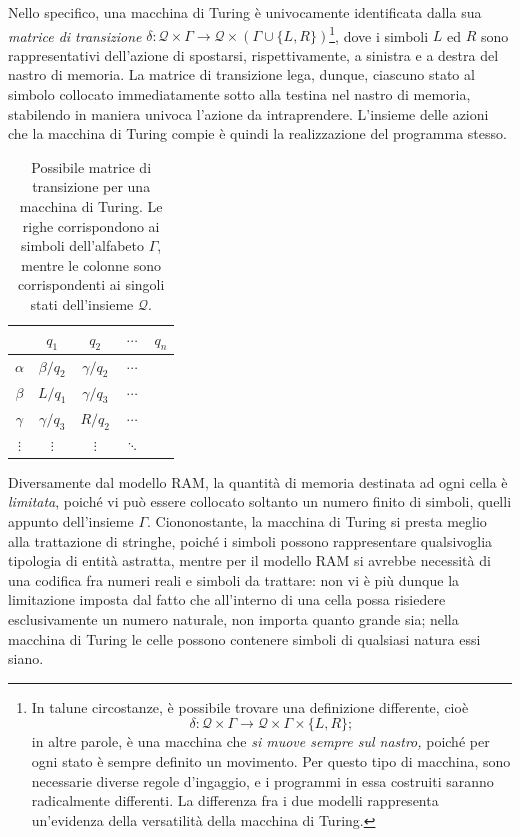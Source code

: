 \documentclass[10pt]{book}
\begin{document}
Nello specifico, una macchina di Turing è univocamente identificata dalla sua
\emph{matrice di transizione} $\delta  : \mathcal Q \times \Gamma \rightarrow
\mathcal Q \times (\Gamma \cup \{L,R\})$\footnote{In talune circostanze, è
possibile trovare una definizione differente, cioè $$\delta  : \mathcal Q \times
\Gamma \rightarrow \mathcal Q \times \Gamma \times \{L,R\};$$ in altre parole, è
una macchina che \emph{si muove sempre sul nastro,} poiché per ogni stato è
sempre definito un movimento. Per questo tipo di macchina, sono necessarie
diverse regole d'ingaggio, e i programmi in essa costruiti saranno radicalmente
differenti. La differenza fra i due modelli rappresenta un'evidenza della
versatilità della macchina di Turing.}, dove i simboli $L$ ed $R$ sono
rappresentativi dell'azione di spostarsi, rispettivamente, a sinistra e a
destra del nastro di memoria. La matrice di transizione lega, dunque, ciascuno
stato al simbolo collocato immediatamente sotto alla testina nel nastro di
memoria, stabilendo in maniera univoca l'azione da intraprendere. L'insieme
delle azioni che la macchina di Turing compie è quindi la realizzazione del
programma stesso.


\begin{table}[ht]
\centering
\begin{tabular}{c|cccc}
    & $q_1$ & $q_2$ & $\cdots$ & $q_n$ \\
    \hline
$\alpha$ & $\beta/q_2$ & $\gamma/q_2$ & $\cdots$ & \\
$\beta$ & $L/q_1$ & $\gamma/q_3$ & $\cdots$ & \\
$\gamma$ & $\gamma/q_3$ & $R/q_2$ & $\cdots$ & \\
$\vdots$ & $\vdots$ & $\vdots$ & $\ddots$ &    
\end{tabular}
\caption{Possibile matrice di transizione per una macchina di Turing. Le righe
corrispondono ai simboli dell'alfabeto $\Gamma$, mentre le colonne sono
corrispondenti ai singoli stati dell'insieme $\mathcal
Q$.}\label{tab:matriceTransizione}
\end{table}
\bigskip


Diversamente dal modello RAM, la quantità di memoria destinata ad ogni cella è
\emph{limitata}, poiché vi può essere collocato soltanto un numero finito di
simboli, quelli appunto dell'insieme $\Gamma$. Ciononostante, la macchina di
Turing si presta meglio alla trattazione di stringhe, poiché i simboli possono
rappresentare qualsivoglia tipologia di entità astratta, mentre per il modello
RAM si avrebbe necessità di una codifica fra numeri reali e simboli da
trattare: non vi è più dunque la limitazione imposta dal fatto che all'interno
di una cella possa risiedere esclusivamente un numero naturale, non importa
quanto grande sia; nella macchina di Turing le celle possono contenere simboli
di qualsiasi natura essi siano.
\end{document}
